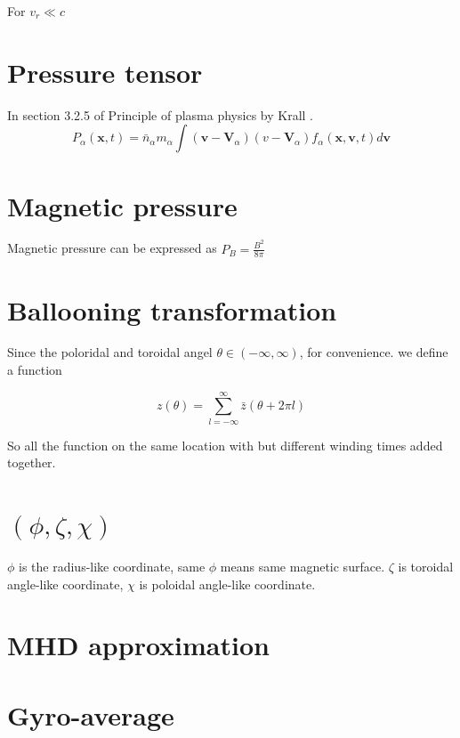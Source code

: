 For $v_r \ll c$ 

\section{Pressure tensor}
In section 3.2.5 of Principle of plasma physics by Krall \cite{Principle}.
\begin{equation}
    P_\alpha(\textbf{x},t)=\bar{n}_\alpha m_\alpha\int (\textbf{v}-\textbf{V}_\alpha)(v-\textbf{V}_\alpha)f_\alpha(\textbf{x},\textbf{v},t)d\textbf{v}
\end{equation}


\section{Magnetic pressure}

Magnetic pressure can be expressed as $P_{B}=\frac{B^{2}}{8 \pi}$


\section{Ballooning transformation}

Since the poloridal and toroidal angel $\theta \in (-\infty, \infty)$, for convenience. we define a function

\begin{equation}
z(\theta)=\sum_{l=-\infty}^{\infty} \bar{z}(\theta+2 \pi l)
\end{equation}

So all the function on the same location with but different winding times added together. 

\section{$(\phi,\zeta ,\chi)$}

$\phi$ is the radius-like coordinate, same $\phi$ means same magnetic surface. $\zeta$ is toroidal angle-like coordinate, $\chi$ is poloidal angle-like coordinate. \cite{Ballooning_transformation}

\section{MHD approximation}



\section{Gyro-average\label{sec:gyro}}

